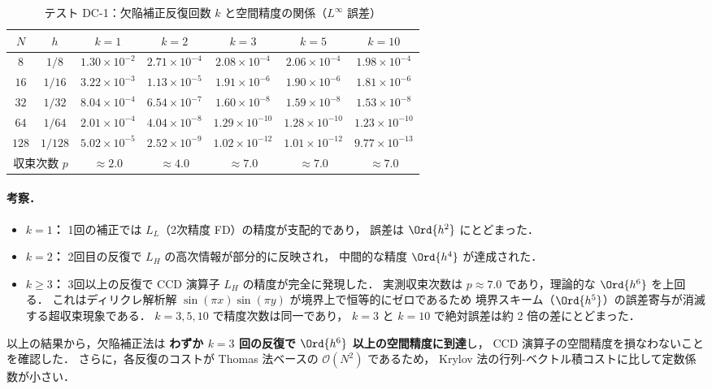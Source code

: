 \begin{table}[htbp]
\centering
\small
\caption{テスト DC-1：欠陥補正反復回数 $k$ と空間精度の関係（$L^\infty$ 誤差）}
\label{tab:dc_iteration_accuracy}
\renewcommand{\arraystretch}{1.3}
\begin{tabular}{ccccccc}
\toprule
$N$ & $h$ & $k=1$ & $k=2$ & $k=3$ & $k=5$ & $k=10$ \\
\midrule
$8$   & $1/8$   & $1.30 \times 10^{-2}$ & $2.71 \times 10^{-4}$ & $2.08 \times 10^{-4}$ & $2.06 \times 10^{-4}$ & $1.98 \times 10^{-4}$ \\
$16$  & $1/16$  & $3.22 \times 10^{-3}$ & $1.13 \times 10^{-5}$ & $1.91 \times 10^{-6}$ & $1.90 \times 10^{-6}$ & $1.81 \times 10^{-6}$ \\
$32$  & $1/32$  & $8.04 \times 10^{-4}$ & $6.54 \times 10^{-7}$ & $1.60 \times 10^{-8}$ & $1.59 \times 10^{-8}$ & $1.53 \times 10^{-8}$ \\
$64$  & $1/64$  & $2.01 \times 10^{-4}$ & $4.04 \times 10^{-8}$ & $1.29 \times 10^{-10}$ & $1.28 \times 10^{-10}$ & $1.23 \times 10^{-10}$ \\
$128$ & $1/128$ & $5.02 \times 10^{-5}$ & $2.52 \times 10^{-9}$ & $1.02 \times 10^{-12}$ & $1.01 \times 10^{-12}$ & $9.77 \times 10^{-13}$ \\
\midrule
\multicolumn{2}{c}{収束次数 $p$} & $\approx 2.0$ & $\approx 4.0$ & $\approx 7.0$ & $\approx 7.0$ & $\approx 7.0$ \\
\bottomrule
\end{tabular}
\end{table}

\paragraph{考察．}

\begin{itemize}
  \item \textbf{$k=1$：} 1回の補正では $L_L$（2次精度 FD）の精度が支配的であり，
        誤差は $\Ord{h^2}$ にとどまった．
  \item \textbf{$k=2$：} 2回目の反復で $L_H$ の高次情報が部分的に反映され，
        中間的な精度 $\Ord{h^4}$ が達成された．
  \item \textbf{$k \geq 3$：} 3回以上の反復で CCD 演算子 $L_H$ の精度が完全に発現した．
        実測収束次数は $p \approx 7.0$ であり，理論的な $\Ord{h^6}$ を上回る．
        これはディリクレ解析解 $\sin(\pi x)\sin(\pi y)$ が境界上で恒等的にゼロであるため
        境界スキーム（$\Ord{h^5}$）の誤差寄与が消滅する超収束現象である．
        $k=3, 5, 10$ で精度次数は同一であり，
        $k=3$ と $k=10$ で絶対誤差は約 2 倍の差にとどまった．
\end{itemize}

以上の結果から，欠陥補正法は \textbf{わずか $k=3$ 回の反復で $\Ord{h^6}$ 以上の空間精度に到達}し，
CCD 演算子の空間精度を損なわないことを確認した．
さらに，各反復のコストが Thomas 法ベースの $\mathcal{O}(N^2)$ であるため，
Krylov 法の行列-ベクトル積コストに比して定数係数が小さい．
